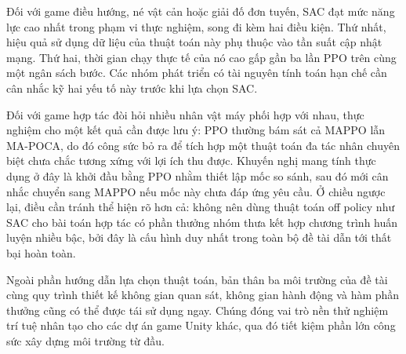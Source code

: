 \indent Đối với game điều hướng, né vật cản hoặc giải đố đơn tuyến, SAC đạt mức năng lực
cao nhất trong phạm vi thực nghiệm, song đi kèm hai điều kiện. Thứ nhất, hiệu quả sử dụng
dữ liệu của thuật toán này phụ thuộc vào tần suất cập nhật mạng. Thứ hai, thời gian chạy
thực tế của nó cao gấp gần ba lần PPO trên cùng một ngân sách bước. Các nhóm phát triển có
tài nguyên tính toán hạn chế cần cân nhắc kỹ hai yếu tố này trước khi lựa chọn SAC.

\indent Đối với game hợp tác đòi hỏi nhiều nhân vật máy phối hợp với nhau, thực nghiệm cho
một kết quả cần được lưu ý: PPO thường bám sát cả MAPPO lẫn MA-POCA, do đó công sức bỏ ra
để tích hợp một thuật toán đa tác nhân chuyên biệt chưa chắc tương xứng với lợi ích thu
được. Khuyến nghị mang tính thực dụng ở đây là khởi đầu bằng PPO nhằm thiết lập mốc so
sánh, sau đó mới cân nhắc chuyển sang MAPPO nếu mốc này chưa đáp ứng yêu cầu. Ở chiều
ngược lại, điều cần tránh thể hiện rõ hơn cả: không nên dùng thuật toán off policy như SAC
cho bài toán hợp tác có phần thưởng nhóm thưa kết hợp chương trình huấn luyện nhiều bậc,
bởi đây là cấu hình duy nhất trong toàn bộ đề tài dẫn tới thất bại hoàn toàn.

\indent Ngoài phần hướng dẫn lựa chọn thuật toán, bản thân ba môi trường của đề tài cùng
quy trình thiết kế không gian quan sát, không gian hành động và hàm phần thưởng cũng có
thể được tái sử dụng ngay. Chúng đóng vai trò nền thử nghiệm trí tuệ nhân tạo cho các dự
án game Unity khác, qua đó tiết kiệm phần lớn công sức xây dựng môi trường từ đầu.
